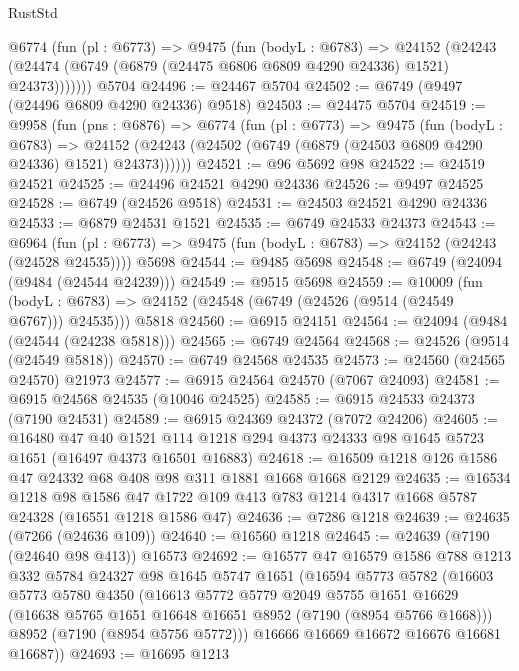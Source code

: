 \begin{lexlean}{RustStd}
\begin{coremodule}
      @6774
        (fun (pl : @6773) =>
        @9475
          (fun (bodyL : @6783) =>
          @24152
            (@24243 (@24474 (@6749 (@6879 (@24475 @6806 @6809 @4290 @24336) @1521) @24373)))))))
    @5704
@24496 := @24467 @5704
@24502 := @6749 (@9497 (@24496 @6809 @4290 @24336) @9518)
@24503 := @24475 @5704
@24519 := @9958
    (fun (pns : @6876) =>
    @6774
      (fun (pl : @6773) =>
      @9475
        (fun (bodyL : @6783) =>
        @24152 (@24243 (@24502 (@6749 (@6879 (@24503 @6809 @4290 @24336) @1521) @24373))))))
@24521 := @96 @5692 @98
@24522 := @24519 @24521
@24525 := @24496 @24521 @4290 @24336
@24526 := @9497 @24525
@24528 := @6749 (@24526 @9518)
@24531 := @24503 @24521 @4290 @24336
@24533 := @6879 @24531 @1521
@24535 := @6749 @24533 @24373
@24543 := @6964
    (fun (pl : @6773) => @9475 (fun (bodyL : @6783) => @24152 (@24243 (@24528 @24535))))
    @5698
@24544 := @9485 @5698
@24548 := @6749 (@24094 (@9484 (@24544 @24239)))
@24549 := @9515 @5698
@24559 := @10009
    (fun (bodyL : @6783) => @24152 (@24548 (@6749 (@24526 (@9514 (@24549 @6767))) @24535)))
    @5818
@24560 := @6915 @24151
@24564 := @24094 (@9484 (@24544 (@24238 @5818)))
@24565 := @6749 @24564
@24568 := @24526 (@9514 (@24549 @5818))
@24570 := @6749 @24568 @24535
@24573 := @24560 (@24565 @24570) @21973
@24577 := @6915 @24564 @24570 (@7067 @24093)
@24581 := @6915 @24568 @24535 (@10046 @24525)
@24585 := @6915 @24533 @24373 (@7190 @24531)
@24589 := @6915 @24369 @24372 (@7072 @24206)
@24605 := @16480
    @47
    @40
    @1521
    @114
    @1218
    @294
    @4373
    @24333
    @98
    @1645
    @5723
    @1651
    (@16497 @4373 @16501 @16883)
@24618 := @16509 @1218 @126 @1586 @47 @24332 @68 @408 @98 @311 @1881 @1668 @1668 @2129
@24635 := @16534
    @1218
    @98
    @1586
    @47
    @1722
    @109
    @413
    @783
    @1214
    @4317
    @1668
    @5787
    @24328
    (@16551 @1218 @1586 @47)
@24636 := @7286 @1218
@24639 := @24635 (@7266 (@24636 @109))
@24640 := @16560 @1218
@24645 := @24639 (@7190 (@24640 @98 @413)) @16573
@24692 := @16577
    @47
    @16579
    @1586
    @788
    @1213
    @332
    @5784
    @24327
    @98
    @1645
    @5747
    @1651
    (@16594
      @5773
      @5782
      (@16603
        @5773
        @5780
        @4350
        (@16613
          @5772
          @5779
          @2049
          @5755
          @1651
          @16629
          (@16638 @5765 @1651 @16648 @16651 @8952 (@7190 (@8954 @5766 @1668)))
          @8952
          (@7190 (@8954 @5756 @5772)))
        @16666
        @16669
        @16672
        @16676
        @16681
        @16687))
@24693 := @16695 @1213

\end{coremodule}
\end{lexlean}

